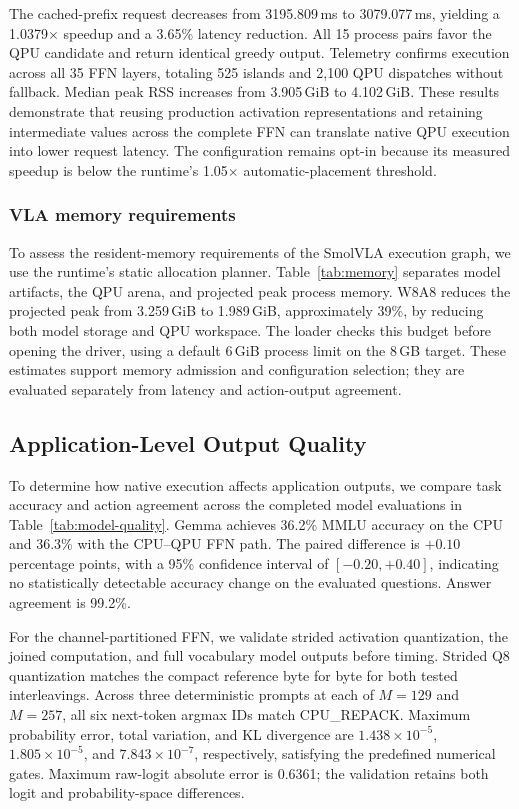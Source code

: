 \documentclass[sigplan,screen,review]{acmart}
\begin{document}
The cached-prefix request decreases from 3195.809\,ms to 3079.077\,ms, yielding a 1.0379$\times$ speedup and a 3.65\% latency reduction. All 15 process pairs favor the QPU candidate and return identical greedy output. Telemetry confirms execution across all 35 FFN layers, totaling 525 islands and 2,100 QPU dispatches without fallback. Median peak RSS increases from 3.905\,GiB to 4.102\,GiB. These results demonstrate that reusing production activation representations and retaining intermediate values across the complete FFN can translate native QPU execution into lower request latency. The configuration remains opt-in because its measured speedup is below the runtime's 1.05$\times$ automatic-placement threshold.


\subsubsection{VLA memory requirements}

To assess the resident-memory requirements of the SmolVLA execution graph, we use the runtime's static allocation planner. Table~\ref{tab:memory} separates model artifacts, the QPU arena, and projected peak process memory. W8A8 reduces the projected peak from 3.259\,GiB to 1.989\,GiB, approximately 39\%, by reducing both model storage and QPU workspace. The loader checks this budget before opening the driver, using a default 6\,GiB process limit on the 8\,GB target. These estimates support memory admission and configuration selection; they are evaluated separately from latency and action-output agreement.

\subsection{Application-Level Output Quality}
\label{sec:quality-results}

To determine how native execution affects application outputs, we compare task accuracy and action agreement across the completed model evaluations in Table~\ref{tab:model-quality}. Gemma achieves 36.2\% MMLU accuracy on the CPU and 36.3\% with the CPU--QPU FFN path. The paired difference is $+0.10$ percentage points, with a 95\% confidence interval of $[-0.20,+0.40]$, indicating no statistically detectable accuracy change on the evaluated questions. Answer agreement is 99.2\%.

For the channel-partitioned FFN, we validate strided activation quantization, the joined computation, and full vocabulary model outputs before timing. Strided Q8 quantization matches the compact reference byte for byte for both tested interleavings. Across three deterministic prompts at each of $M=129$ and $M=257$, all six next-token argmax IDs match CPU\_REPACK. Maximum probability error, total variation, and KL divergence are $1.438\times10^{-5}$, $1.805\times10^{-5}$, and $7.843\times10^{-7}$, respectively, satisfying the predefined numerical gates. Maximum raw-logit absolute error is 0.6361; the validation retains both logit and probability-space differences.
\end{document}
